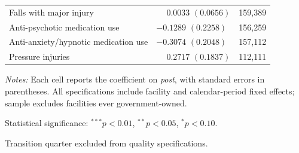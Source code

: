 \begin{table}[!ht]
\begin{threeparttable}
\begin{tabularx}{\textwidth}{@{} l Y r @{}}
Falls with major injury &  & 159,389 \\
Anti-psychotic medication use &  & 156,259 \\
Anti-anxiety/hypnotic medication use &  & 157,112 \\
Pressure injuries &  & 112,111 \\
\bottomrule
\end{tabularx}

\begin{tablenotes}[flushleft]
\footnotesize
\item \textit{Notes:} Each cell reports the coefficient on \textit{post}, with standard errors in parentheses. All specifications include facility and calendar-period fixed effects; sample excludes facilities ever government-owned.
\item Statistical significance: $^{***}p<0.01$, $^{**}p<0.05$, $^{*}p<0.10$.
\item Transition quarter excluded from quality specifications.
\end{tablenotes}
\end{threeparttable}
\end{table}

